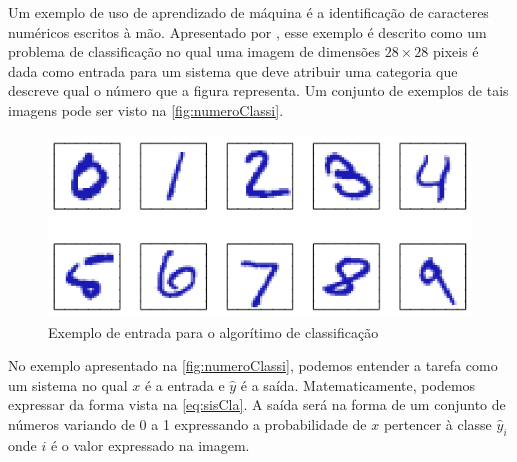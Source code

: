 \documentclass[
    12pt,
    oneside,
    a4paper,
    english,
    brazil
]{abntex2}
\begin{document}
Um exemplo de uso de aprendizado de máquina é a identificação de caracteres  numéricos escritos à mão. Apresentado por , esse exemplo é descrito como  um problema de  classificação no qual uma imagem  de dimensões $28 \times 28$ pixeis é dada como  entrada para um sistema que deve atribuir uma categoria que descreve qual o número que a figura representa.  Um conjunto de exemplos de tais imagens  pode ser  visto na \autoref{fig:numeroClassi}.

\begin{figure}[ht]
    \centering
    \caption{Exemplo de entrada para o algorítimo de
        classificação}\label{fig:numeroClassi}
    \includegraphics[width=.5\linewidth]{images/numeroClassificacao.png}
\end{figure}

No exemplo apresentado na \autoref{fig:numeroClassi}, podemos entender a tarefa como um sistema no qual $x$  é a  entrada  e $\hat{y}$  é a  saída.
Matematicamente, podemos expressar da  forma vista  na \autoref{eq:sisCla}.  A saída será na forma  de um conjunto de números variando de 0  a 1 expressando a probabilidade  de  $x$ pertencer  à  classe  $\hat{y}_i$  onde  $i$ é o valor expressado na imagem.
\end{document}
